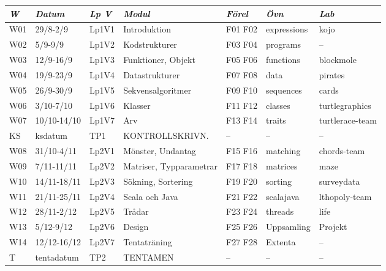 \begin{tabular}{l|l|l|l|l|l|l}
\textit{W} & \textit{Datum} & \textit{Lp V} & \textit{Modul} & \textit{Förel} & \textit{Övn} & \textit{Lab} \\ \hline \hline
W01 & 29/8-2/9    & Lp1V1 & Introduktion            & F01 F02 & expressions & kojo            \\
W02 & 5/9-9/9     & Lp1V2 & Kodstrukturer           & F03 F04 & programs    & --              \\
W03 & 12/9-16/9   & Lp1V3 & Funktioner, Objekt      & F05 F06 & functions   & blockmole       \\
W04 & 19/9-23/9   & Lp1V4 & Datastrukturer          & F07 F08 & data        & pirates         \\
W05 & 26/9-30/9   & Lp1V5 & Sekvensalgoritmer       & F09 F10 & sequences   & cards           \\
W06 & 3/10-7/10   & Lp1V6 & Klasser                 & F11 F12 & classes     & turtlegraphics  \\
W07 & 10/10-14/10 & Lp1V7 & Arv                     & F13 F14 & traits      & turtlerace-team \\
KS  & ksdatum     & TP1   & KONTROLLSKRIVN.         & --      & --          & --              \\
W08 & 31/10-4/11  & Lp2V1 & Mönster, Undantag       & F15 F16 & matching    & chords-team     \\
W09 & 7/11-11/11  & Lp2V2 & Matriser, Typparametrar & F17 F18 & matrices    & maze            \\
W10 & 14/11-18/11 & Lp2V3 & Sökning, Sortering      & F19 F20 & sorting     & surveydata      \\
W11 & 21/11-25/11 & Lp2V4 & Scala och Java          & F21 F22 & scalajava   & lthopoly-team   \\
W12 & 28/11-2/12  & Lp2V5 & Trådar                  & F23 F24 & threads     & life            \\
W13 & 5/12-9/12   & Lp2V6 & Design                  & F25 F26 & Uppsamling  & Projekt         \\
W14 & 12/12-16/12 & Lp2V7 & Tentaträning            & F27 F28 & Extenta     & --              \\
T   & tentadatum  & TP2   & TENTAMEN                & --      & --          & --              \\
\end{tabular}

